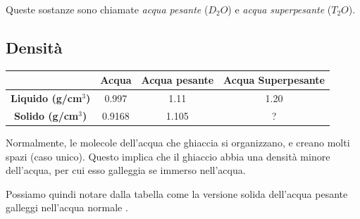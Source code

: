 \documentclass[a4paper]{article}
\begin{document}
Queste sostanze sono chiamate \textit{acqua pesante} (\(D_2O\)) e
\textit{acqua superpesante} (\(T_2O\)).

\subsection{Densità}

\begin{center}
    \bgroup{}
    \def\arraystretch{1.25}
    \begin{tabular}{ |c|c|c|c| }
        \hline
        & \textbf{Acqua} & \textbf{Acqua pesante} & \textbf{Acqua Superpesante} \\
        \hline
        \textbf{Liquido (g/cm\(^3\))} & 0.997 & 1.11 & 1.20 \\
        \hline
        \textbf{Solido (g/cm\(^3\))} & 0.9168 & 1.105 & ? \\
        \hline
    \end{tabular}
    \egroup{}
\end{center}

Normalmente, le molecole dell'acqua che ghiaccia si organizzano, e creano molti spazi (caso unico).
Questo implica che il ghiaccio abbia una densità minore dell'acqua, per cui esso galleggia se immerso nell'acqua.

Possiamo quindi notare dalla tabella come la versione solida dell'acqua pesante galleggi
nell'acqua normale \cite{deuterated-water}.

\nocite{*} %

\printbibliography

\end{document}
